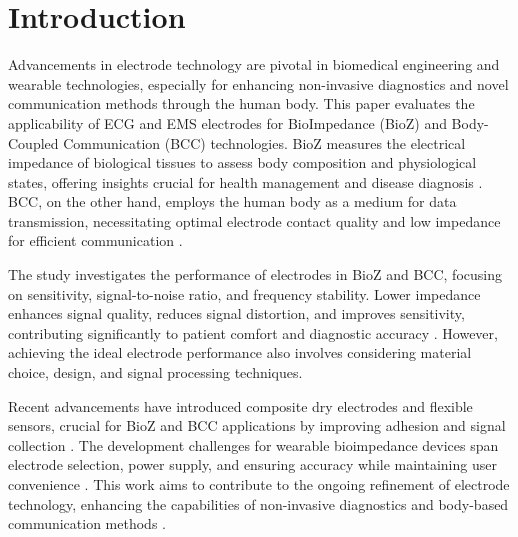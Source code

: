 \section{Introduction}
{
Advancements in electrode technology are pivotal in biomedical engineering and wearable technologies, especially for enhancing non-invasive diagnostics and novel communication methods through the human body. This paper evaluates the applicability of ECG and EMS electrodes for BioImpedance (BioZ) and Body-Coupled Communication (BCC) technologies. BioZ measures the electrical impedance of biological tissues to assess body composition and physiological states, offering insights crucial for health management and disease diagnosis \cite{Grimnes2000bioimpedance}. BCC, on the other hand, employs the human body as a medium for data transmission, necessitating optimal electrode contact quality and low impedance for efficient communication \cite{Tallgren2005Evaluation}.

The study investigates the performance of electrodes in BioZ and BCC, focusing on sensitivity, signal-to-noise ratio, and frequency stability. Lower impedance enhances signal quality, reduces signal distortion, and improves sensitivity, contributing significantly to patient comfort and diagnostic accuracy \cite{Buxi2013correlation}. However, achieving the ideal electrode performance also involves considering material choice, design, and signal processing techniques.

Recent advancements have introduced composite dry electrodes and flexible sensors, crucial for BioZ and BCC applications by improving adhesion and signal collection \cite{lee2021recent}. The development challenges for wearable bioimpedance devices span electrode selection, power supply, and ensuring accuracy while maintaining user convenience \cite{rabbani2023low}. This work aims to contribute to the ongoing refinement of electrode technology, enhancing the capabilities of non-invasive diagnostics and body-based communication methods \cite{ormanis2020towards, zaira2023prediction}.
}